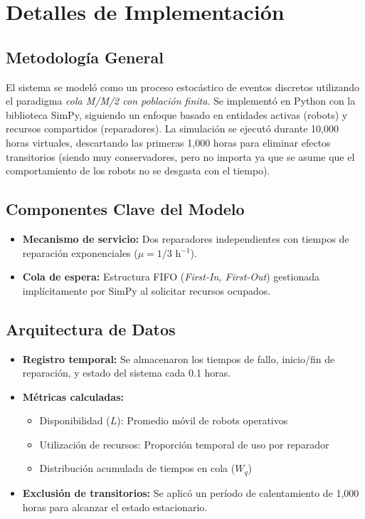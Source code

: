 \documentclass[12pt, a4paper]{article}
\begin{document}
\section{Detalles de Implementación}

\subsection{Metodología General}
El sistema se modeló como un proceso estocástico de eventos discretos utilizando el paradigma \textit{cola M/M/2 con población finita}. Se implementó en Python con la biblioteca SimPy, siguiendo un enfoque basado en entidades activas (robots) y recursos compartidos (reparadores). La simulación se ejecutó durante 10,000 horas virtuales, descartando las primeras 1,000 horas para eliminar efectos transitorios (siendo muy conservadores, pero no importa ya que se asume que el comportamiento de los robots no se desgasta con el tiempo).

\subsection{Componentes Clave del Modelo}
\begin{itemize}
    \item \textbf{Mecanismo de servicio:} Dos reparadores independientes con tiempos de reparación exponenciales ($\mu = 1/3$ h$^{-1}$).
    
    \item \textbf{Cola de espera:} Estructura FIFO (\textit{First-In, First-Out}) gestionada implícitamente por SimPy al solicitar recursos ocupados.
\end{itemize}

\subsection{Arquitectura de Datos}
\begin{itemize}
    \item \textbf{Registro temporal:} Se almacenaron los tiempos de fallo, inicio/fin de reparación, y estado del sistema cada 0.1 horas.
    
    \item \textbf{Métricas calculadas:} 
    \begin{itemize}
        \item Disponibilidad ($L$): Promedio móvil de robots operativos
        \item Utilización de recursos: Proporción temporal de uso por reparador
        \item Distribución acumulada de tiempos en cola ($W_q$)
    \end{itemize}
    \item \textbf{Exclusión de transitorios:} Se aplicó un período de calentamiento de 1,000 horas para alcanzar el estado estacionario.
\end{itemize}
\end{document}
